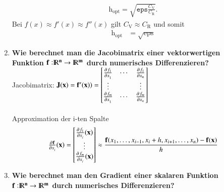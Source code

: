 \begin{enumerate}
			\begin{align*}
				\text{h}_\text{opt}=\sqrt{\texttt{eps}\frac{C_\text{V}}{C_\text{R}}}.
			\end{align*}			 
			Bei \(f(x)\approx f'(x) \approx f''(x)\) gilt \(C_\text{V} \approx C_\text{R}\) und somit
			\begin{align*}
				\text{h}_\text{opt}&=\sqrt{\text{eps}}
			\end{align*}
		\item \textbf{Wie berechnet man die Jacobimatrix einer vektorwertigen Funktion \(\mathbf{f:}{\rm I\!R}\mathbf{^n} \rightarrow {\rm I\!R}\mathbf{^m}\) durch numerisches Differenzieren?}\\
			Jacobimatrix: \(\mathbf{J(x)}=\mathbf{f'(x)})=\begin{bmatrix}
				\pd{f_1}{x_1} & \cdots & \pd{f_1}{x_n} \\
				\vdots &  & \vdots \\
				\pd{f_{m}}{x_1} & \cdots & \pd{f_m}{x_n}
			\end{bmatrix}\) \\\\
			Approximation der i-ten Spalte
			\begin{align*}
				\pd{\mathbf{f}}{x_i}(\mathbf{x})=
					\begin{bmatrix}
						\pd{f_1}{x_i}(\mathbf{x}) \\
						\vdots \\
						\pd{f_m}{x_i}(\mathbf{x})
					\end{bmatrix}
					\approx \frac{\mathbf{f}(x_1,\dots,x_{i-1},x_i+h,x_{i+1},\dots,x_n)-\mathbf{f(x)}}{h}
			\end{align*}
		\item \textbf{Wie berechnet man den Gradient einer skalaren Funktion \(\mathbf{f:}{\rm I\!R}\mathbf{^n} \rightarrow {\rm I\!R}\mathbf{^m}\) durch numerisches Differenzieren?}\\
	\end{enumerate}